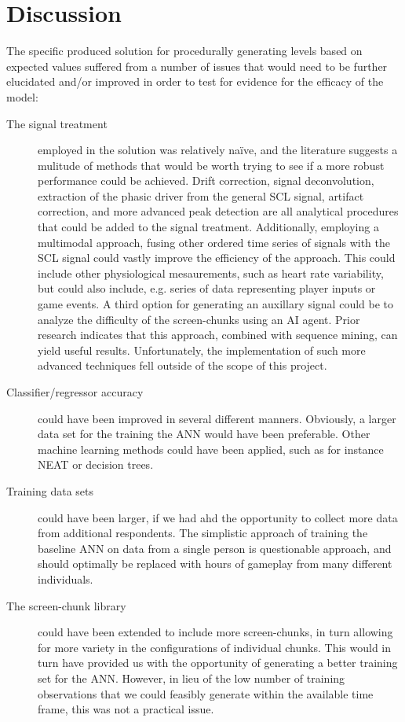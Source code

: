 \documentclass{llncs}
\begin{document}
\section{Discussion}
The specific produced solution for procedurally generating levels based on expected values suffered from a number of issues that would need to be further elucidated and/or improved in order to test for evidence for the efficacy of the model:
\begin{description}
\item [The signal treatment] employed in the solution was relatively naïve, and the literature suggests a mulitude of methods that would be worth trying to see if a more robust performance could be achieved. Drift correction, signal deconvolution, extraction of the phasic driver from the general SCL signal, artifact correction, and more advanced peak detection are all analytical procedures that could be added to the signal treatment. Additionally, employing a multimodal approach, fusing other ordered time series of signals with the SCL signal could vastly improve the efficiency of the approach. This could include other physiological mesaurements, such as heart rate variability, but could also include, e.g. series of data representing player inputs or game events. A third option for generating an auxillary signal could be to analyze the difficulty of the screen-chunks using an AI agent. Prior research indicates that this approach, combined with sequence mining, can yield useful results. Unfortunately, the implementation of such more advanced techniques fell outside of the scope of this project.
\item [Classifier/regressor accuracy] could have been improved in several different manners. Obviously, a larger data set for the training the ANN would have been preferable. Other machine learning methods could have been applied, such as for instance NEAT or decision trees.
\item [Training data sets] could have been larger, if we had ahd the opportunity to collect more data from additional respondents. The simplistic approach of training the baseline ANN on data from a single person is questionable approach, and should optimally be replaced with hours of gameplay from many different individuals.
\item [The screen-chunk library] could have been extended to include more screen-chunks, in turn allowing for more variety in the configurations of individual chunks. This would in turn have provided us with the opportunity of generating a better training set for the ANN. However, in lieu of the low number of training observations that we could feasibly generate within the available time frame, this was not a practical issue.
\end{description}
\end{document}

